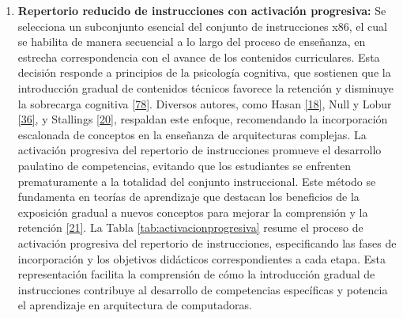 \documentclass[12pt,oneside]{templates/unerthesis}
\providecommand{\tightlist}{%
  \setlength{\itemsep}{0pt}\setlength{\parskip}{0pt}}
\begin{document}
\begin{enumerate}
\def\labelenumi{\arabic{enumi}.}
\setcounter{enumi}{2}
\tightlist
\item
  \textbf{Repertorio reducido de instrucciones con activación progresiva:}
  Se selecciona un subconjunto esencial del conjunto de instrucciones x86, el cual se habilita de manera secuencial a lo largo del proceso de enseñanza, en estrecha correspondencia con el avance de los contenidos curriculares. Esta decisión responde a principios de la psicología cognitiva, que sostienen que la introducción gradual de contenidos técnicos favorece la retención y disminuye la sobrecarga cognitiva \protect\hyperlink{ref-nationalacademies2018how}{{[}78{]}}. Diversos autores, como Hasan \protect\hyperlink{ref-hasan_survey_2012}{{[}18{]}}, Null y Lobur \protect\hyperlink{ref-null_essentials_2023}{{[}36{]}}, y Stallings \protect\hyperlink{ref-stallings_computer_2021}{{[}20{]}}, respaldan este enfoque, recomendando la incorporación escalonada de conceptos en la enseñanza de arquitecturas complejas.
  La activación progresiva del repertorio de instrucciones promueve el desarrollo paulatino de competencias, evitando que los estudiantes se enfrenten prematuramente a la totalidad del conjunto instruccional. Este método se fundamenta en teorías de aprendizaje que destacan los beneficios de la exposición gradual a nuevos conceptos para mejorar la comprensión y la retención \protect\hyperlink{ref-sweller2010cognitive}{{[}21{]}}. La Tabla \ref{tab:activacionprogresiva} resume el proceso de activación progresiva del repertorio de instrucciones, especificando las fases de incorporación y los objetivos didácticos correspondientes a cada etapa. Esta representación facilita la comprensión de cómo la introducción gradual de instrucciones contribuye al desarrollo de competencias específicas y potencia el aprendizaje en arquitectura de computadoras.
\end{enumerate}
\end{document}
